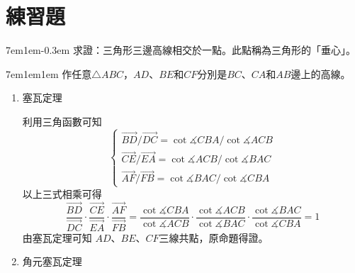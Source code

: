 \documentclass[12pt]{article}
\begin{document}
\section{練習題}
\begin{mybox}[Problem 1]{7em}{1em}{-0.3em}
   求證：三角形三邊高線相交於一點。此點稱為三角形的「垂心」。
\end{mybox}
\begin{mybox}[Answer 1]{7em}{1em}{1em}
    作任意$\triangle{ABC}$，$AD$、$BE$和$CF$分別是$BC$、$CA$和$AB$邊上的高線。
    \begin{enumerate}[label = 方法 \arabic*：]
        \item 塞瓦定理
        
        利用三角函數可知
        $$
            \begin{cases}
                \overrightarrow{BD}/\overrightarrow{DC}=\cot{\measuredangle{CBA}}/\cot{\measuredangle{ACB}}\\
                \overrightarrow{CE}/\overrightarrow{EA}=\cot{\measuredangle{ACB}}/\cot{\measuredangle{BAC}}\\
                \overrightarrow{AF}/\overrightarrow{FB}=\cot{\measuredangle{BAC}}/\cot{\measuredangle{CBA}}
            \end{cases}
        $$
        以上三式相乘可得
        $$
            \frac{\overrightarrow{BD}}{\overrightarrow{DC}}
            \cdot\frac{\overrightarrow{CE}}{\overrightarrow{EA}}
            \cdot\frac{\overrightarrow{AF}}{\overrightarrow{FB}} = 
            \frac{\cot{\measuredangle{CBA}}}{\cot{\measuredangle{ACB}}}
            \cdot\frac{\cot{\measuredangle{ACB}}}{\cot{\measuredangle{BAC}}}
            \cdot\frac{\cot{\measuredangle{BAC}}}{\cot{\measuredangle{CBA}}}=1
        $$
        由塞瓦定理可知 $AD$、$BE$、$CF$三線共點，原命題得證。
        \item 角元塞瓦定理
        

\end{enumerate}
\end{mybox}
\end{document}

